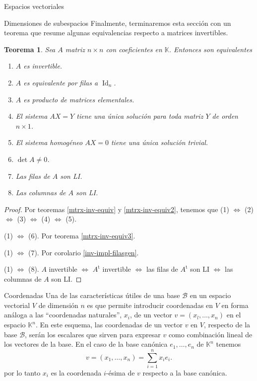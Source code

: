 \documentclass[a4paper,12pt,twoside,spanish,reqno]{amsbook}
\newtheorem{teorema}{Teorema}[section]
\theoremstyle{definition}
\theoremstyle{remark}
\newcommand{\Id}{\operatorname{Id}}
\renewcommand{\t}{{\operatorname{t}}}
\newcommand{\K}{\mathbb K}
\begin{document}
\begin{chapter}{Espacios vectoriales}
\begin{section}{Dimensiones de subespacios}
Finalmente, terminaremos esta sección con un teorema que resume algunas equivalencias respecto a matrices invertibles.

\begin{teorema}
	Sea $A$ matriz $n \times n$ con coeficientes en $\K$. Entonces son equivalentes
	\begin{enumerate} 
		\item $A$ es invertible.
		\item $A$  es equivalente por filas a $\Id_n$.
		\item $A$ es producto de matrices elementales.
		\item El sistema $AX=Y$ tiene una única solución para toda matriz $Y$ de orden $n \times 1$. 
		\item El sistema homogéneo $AX=0$ tiene una única solución trivial.
		\item $\det A \ne 0$.
		\item Las filas de $A$ son LI.
		\item Las columnas de $A$ son LI.
	\end{enumerate}
\end{teorema}
\begin{proof} Por teoremas \ref{mtrx-inv-equiv} y  \ref{mtrx-inv-equiv2}, tenemos que 	(1) $\Leftrightarrow$ 	(2) $\Leftrightarrow$ 	(3) $\Leftrightarrow$ 	(4) $\Leftrightarrow$ 	(5).
	
	(1) $\Leftrightarrow$ (6). Por teorema \ref{mtrx-inv-equiv3}.
	
	(1) $\Leftrightarrow$ (7). Por corolario \ref{inv-impl-filasgen}.
	
	(1) $\Leftrightarrow$ (8). $A$ invertible $\Leftrightarrow$ $A^\t$ invertible $\Leftrightarrow$  las filas de $A^\t$ son LI $\Leftrightarrow$  las columnas de $A$ son LI. 
\end{proof}
	
	\end{section}




	\begin{section}{Coordenadas}
		Una de las características útiles de una base $\mathcal B$ en un espacio vectorial  $V$ de dimensión $n$ es que permite introducir coordenadas en $V$ en forma análoga a las ``coordenadas naturales'', $x_i$, de un vector $v = (x_l,\ldots, x_n)$ en el espacio $\K^n$. En este esquema, las coordenadas de un vector $v$ en $V$, respecto de la base $\mathcal B$, serán los escalares que sirven para expresar $v$ como combinación lineal de los vectores de la base. En  el caso  de la base canónica $e_1,\ldots,e_n$ de $\K^n$ tenemos
		$$
		v = (x_1,\ldots,x_n) = \sum_{i=1}^{n} x_ie_i.
		$$
		por lo tanto $x_i$  es la coordenada $i$-ésima de $v$ respecto a la base canónica. 
		

\end{section}
\end{chapter}
\end{document}
